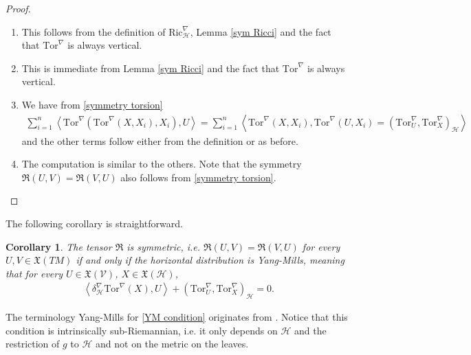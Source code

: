 \documentclass[11pt]{article}
\numberwithin{equation}{section}
\newtheorem{corollary}[theorem]{Corollary}
\newcommand{\Ho}{\mathcal H}
\newcommand{\V}{\mathcal V}
\newcommand{\Tor}{\mathrm{Tor}}
\begin{document}
\begin{proof}

\

\begin{enumerate}
\item This follows from the definition of $\mathrm{Ric}^\nabla_\Ho$, Lemma \ref{sym Ricci} and the fact that $\Tor^\nabla$ is always vertical.
\item This is immediate from Lemma \ref{sym Ricci} and the fact that $\Tor^\nabla$ is always vertical.
\item We have from \eqref{symmetry torsion} 
\begin{align*}
\sum_{i=1}^n \left\langle \Tor^\nabla(\Tor^\nabla(X,X_i),X_i),U \right\rangle =\sum_{i=1}^n \left\langle \Tor^\nabla(X,X_i),\Tor^\nabla(U,X_i) =(\Tor^\nabla_U ,\Tor^\nabla_X)_\Ho\right\rangle
\end{align*}
and the other terms follow either from the definition or as before.
\item The computation is similar to the others. Note that the symmetry $\mathfrak{R}(U,V)=\mathfrak{R}(V,U)$ also follows from \eqref{symmetry torsion}.
\end{enumerate}
\end{proof}

The following corollary is straightforward.

\begin{corollary}
The tensor $\mathfrak{R}$ is symmetric, i.e. $\mathfrak{R}(U,V)=\mathfrak{R}(V,U)$ for every $U,V \in \mathfrak{X}(TM)$ if and only if the horizontal distribution is Yang-Mills, meaning that for every $U \in \mathfrak{X}(\V)$, $X \in \mathfrak{X}(\Ho)$,
\begin{align}\label{YM condition}
\left\langle \delta_\Ho^\nabla \Tor^\nabla (X),U \right\rangle+(\Tor^\nabla_U ,\Tor^\nabla_X)_\Ho=0 .
\end{align}
\end{corollary}

The terminology Yang-Mills for \eqref{YM condition} originates from \cite[Definition 9.35]{Besse}. Notice that this condition is intrinsically sub-Riemannian, i.e. it only depends on $\mathcal{H}$ and the restriction of $g$ to $\mathcal{H}$ and not on the metric on the leaves.
\end{document}
